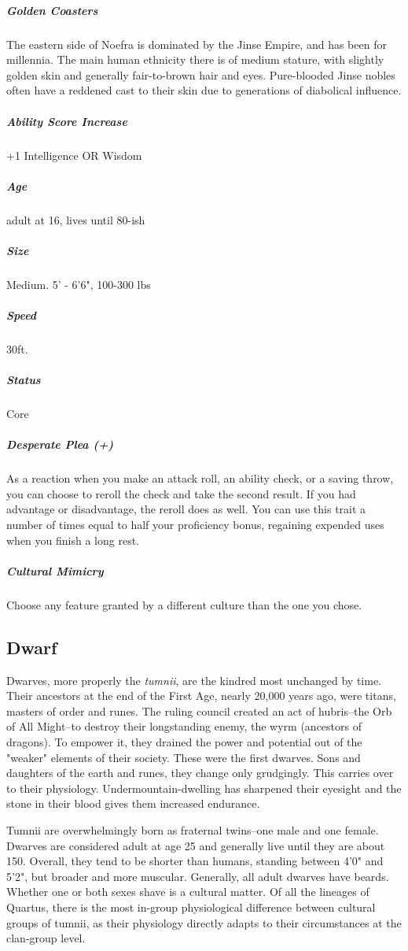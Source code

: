 \subparagraph*{Golden Coasters} The eastern side of Noefra is dominated by the Jinse Empire, and has been for millennia. The main human ethnicity there is of medium stature, with slightly golden skin and generally fair-to-brown hair and eyes. Pure-blooded Jinse nobles often have a reddened cast to their skin due to generations of diabolical influence.

\subparagraph*{Ability Score Increase}  +1 Intelligence OR Wisdom

\subparagraph*{Age}  adult at 16, lives until 80-ish

\subparagraph*{Size}  Medium. 5' - 6'6", 100-300 lbs

\subparagraph*{Speed}  30ft.

\subparagraph*{Status}  Core

\subparagraph*{Desperate Plea (+)}  As a reaction when you make an attack roll, an ability check, or a saving throw, you can choose to reroll the check and take the second result. If you had advantage or disadvantage, the reroll does as well. You can use this trait a number of times equal to half your proficiency bonus, regaining expended uses when you finish a long rest.

\subparagraph*{Cultural Mimicry}  Choose any feature granted by a different culture than the one you chose.

\subsection{Dwarf}\label{lineage:dwarf}

Dwarves, more properly the \textit{tumnii}, are the kindred most unchanged by time. Their ancestors at the end of the First Age, nearly 20,000 years ago, were titans, masters of order and runes. The ruling council created an act of hubris--the Orb of All Might--to destroy their longstanding enemy, the wyrm (ancestors of dragons). To empower it, they drained the power and potential out of the "weaker" elements of their society. These were the first dwarves. Sons and daughters of the earth and runes, they change only grudgingly. This carries over to their physiology. Undermountain-dwelling has sharpened their eyesight and the stone in their blood gives them increased endurance.

Tumnii are overwhelmingly born as fraternal twins--one male and one female. Dwarves are considered adult at age 25 and generally live until they are about 150. Overall, they tend to be shorter than humans, standing between 4'0" and 5'2", but broader and more muscular. Generally, all adult dwarves have beards. Whether one or both sexes shave is a cultural matter. Of all the lineages of Quartus, there is the most in-group physiological difference between cultural groups of tumnii, as their physiology directly adapts to their circumstances at the clan-group level.

